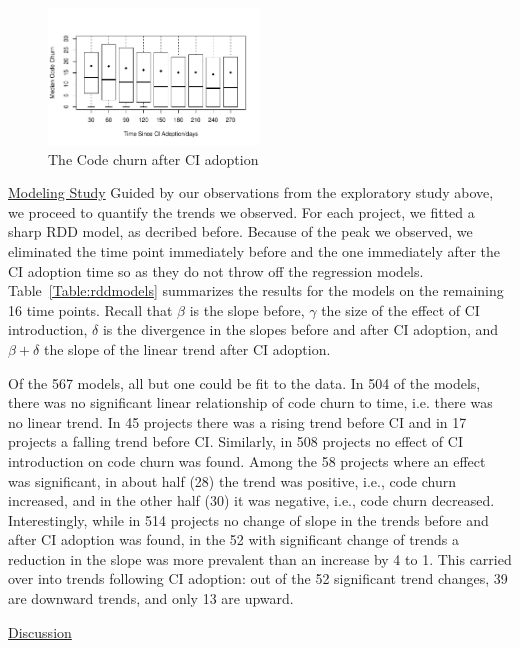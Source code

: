 \documentclass[conference]{IEEEtran}
\begin{document}
\begin{figure}[!t]
\centering
\includegraphics[width=0.5\textwidth]{churn_after.pdf}
\caption{The Code churn after CI adoption}
\label{Fig:CodeChurnAfter}
\end{figure}

\noindent \underline{Modeling Study} 
Guided by our observations from the exploratory study above, we proceed to quantify the trends we observed.
For each project, we fitted a sharp RDD model, as decribed before.
Because of the peak we observed, we eliminated the time point immediately before and the one immediately after the CI adoption time so as they do not throw off the regression models.
Table~\ref{Table:rddmodels} summarizes the results for the models on the remaining 16 time points.
Recall that $\beta$ is the slope before, $\gamma$ the size of the effect of CI introduction, $\delta$ is the divergence in the slopes before and after CI adoption, and $\beta + \delta$ the slope of the linear trend after CI adoption.

Of the 567 models, all but one could be fit to the data.
In 504 of the models, there was no significant linear relationship of code churn to time, i.e. there was no linear trend.
In 45 projects there was a rising trend before CI and in 17 projects a falling trend before CI.
Similarly, in 508 projects no effect of CI introduction on code churn was found. Among the 58 projects where an effect was significant, in about half (28) the trend was positive, i.e., code churn increased, and in the other half (30) it was negative, i.e., code churn decreased.
Interestingly, while in 514 projects no change of slope in the trends before and after CI adoption was found, in the 52 with significant change of trends a reduction in the slope was more prevalent than an increase by 4 to 1.
This carried over into trends following CI adoption: out of the 52 significant trend changes, 39 are downward trends, and only 13 are upward.


\noindent \underline{Discussion}
\end{document}

